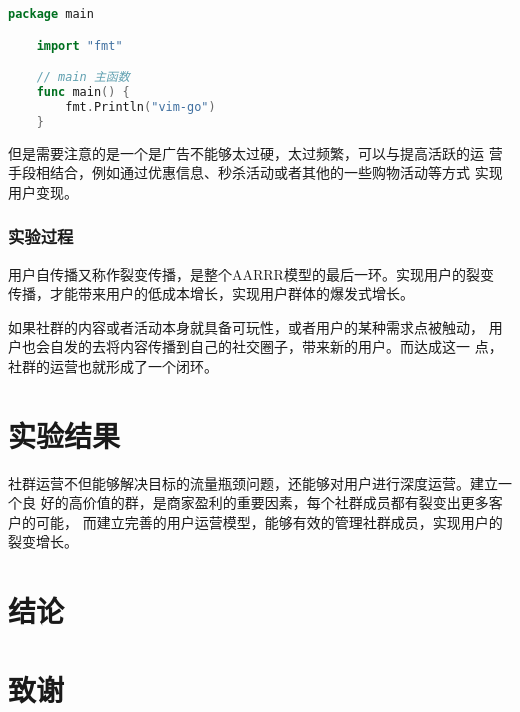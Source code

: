 \documentclass{article}
\begin{document}
    \begin{lstlisting}[language=Go]
    package main

    import "fmt"

    // main 主函数
    func main() {
        fmt.Println("vim-go")
    }
    \end{lstlisting}

    但是需要注意的是一个是广告不能够太过硬，太过频繁，可以与提高活跃的运
    营手段相结合，例如通过优惠信息、秒杀活动或者其他的一些购物活动等方式
    实现用户变现。

    \subsubsection{实验过程}
    用户自传播又称作裂变传播，是整个AARRR模型的最后一环。实现用户的裂变
    传播，才能带来用户的低成本增长，实现用户群体的爆发式增长。

    如果社群的内容或者活动本身就具备可玩性，或者用户的某种需求点被触动，
    用户也会自发的去将内容传播到自己的社交圈子，带来新的用户。而达成这一
    点，社群的运营也就形成了一个闭环。

    \section{实验结果}
    社群运营不但能够解决目标的流量瓶颈问题，还能够对用户进行深度运营。建立一个良
    好的高价值的群，是商家盈利的重要因素，每个社群成员都有裂变出更多客户的可能，
    而建立完善的用户运营模型，能够有效的管理社群成员，实现用户的裂变增长。

    \section{结论}

    \section{致谢}

\clearpage
\end{document}
